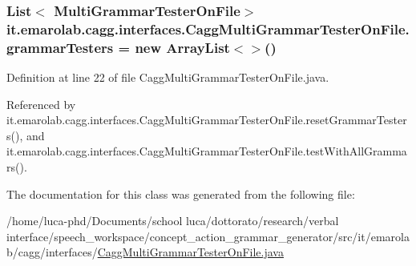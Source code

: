 \hypertarget{classit_1_1emarolab_1_1cagg_1_1interfaces_1_1CaggMultiGrammarTesterOnFile_a422be123c40e423312cc459ffdc0dd21}{
\subsubsection[{grammar\-Testers}]{\setlength{\rightskip}{0pt plus 5cm}List$<$ {\bf Multi\-Grammar\-Tester\-On\-File}$>$ it.\-emarolab.\-cagg.\-interfaces.\-Cagg\-Multi\-Grammar\-Tester\-On\-File.\-grammar\-Testers = new Array\-List$<$$>$()\hspace{0.3cm}{\ttfamily [private]}}}\label{classit_1_1emarolab_1_1cagg_1_1interfaces_1_1CaggMultiGrammarTesterOnFile_a422be123c40e423312cc459ffdc0dd21}


Definition at line 22 of file Cagg\-Multi\-Grammar\-Tester\-On\-File.\-java.



Referenced by it.\-emarolab.\-cagg.\-interfaces.\-Cagg\-Multi\-Grammar\-Tester\-On\-File.\-reset\-Grammar\-Testers(), and it.\-emarolab.\-cagg.\-interfaces.\-Cagg\-Multi\-Grammar\-Tester\-On\-File.\-test\-With\-All\-Grammars().



The documentation for this class was generated from the following file\-:\begin{DoxyCompactItemize}
\item 
/home/luca-\/phd/\-Documents/school luca/dottorato/research/verbal interface/speech\-\_\-workspace/concept\-\_\-action\-\_\-grammar\-\_\-generator/src/it/emarolab/cagg/interfaces/\hyperlink{CaggMultiGrammarTesterOnFile_8java}{Cagg\-Multi\-Grammar\-Tester\-On\-File.\-java}\end{DoxyCompactItemize}
